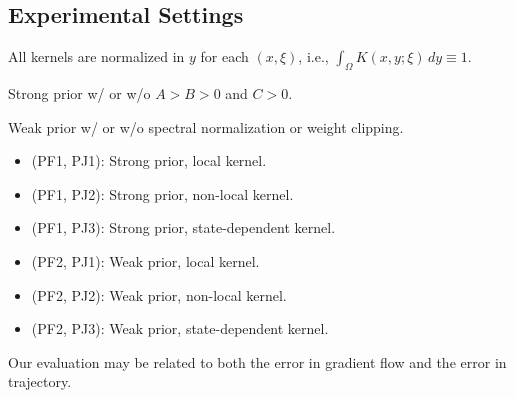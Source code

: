 \documentclass[11pt,a4paper]{article}
\theoremstyle{plain}
\theoremstyle{definition}
\theoremstyle{remark}
\begin{document}

\subsection{Experimental Settings}

All kernels are normalized in $y$ for each $(x,\xi)$, i.e., $\int_{\Omega}K(x,y;\xi)\,dy\equiv1$.


\noindent
Strong prior w/ or w/o $A>B>0$ and $C>0$.

\noindent
Weak prior w/ or w/o spectral normalization or weight clipping.

\begin{itemize}
	\item (PF1, PJ1): Strong prior, local kernel.
	\item (PF1, PJ2): Strong prior, non-local kernel.
	\item (PF1, PJ3): Strong prior, state-dependent kernel.
\end{itemize}

\begin{itemize}
	\item (PF2, PJ1): Weak prior, local kernel.
	\item (PF2, PJ2): Weak prior, non-local kernel.
	\item (PF2, PJ3): Weak prior, state-dependent kernel.
\end{itemize}


Our evaluation may be related to both the error in gradient flow and the error in trajectory.



\end{document}
